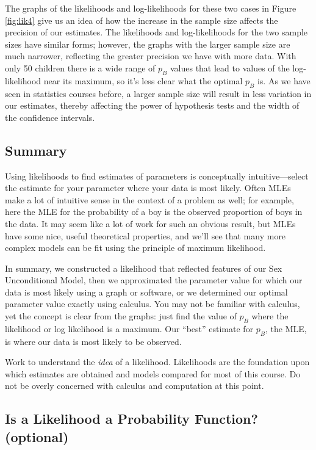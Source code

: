 \documentclass[
]{krantz}
\begin{document}
The graphs of the likelihoods and log-likelihoods for these two cases in Figure \ref{fig:lik4} give us an idea of how the increase in the sample size affects the precision of our estimates. The likelihoods and log-likelihoods for the two sample sizes have similar forms; however, the graphs with the larger sample size are much narrower, reflecting the greater precision we have with more data. With only 50 children there is a wide range of \(p_B\) values that lead to values of the log-likelihood near its maximum, so it's less clear what the optimal \(p_B\) is. As we have seen in statistics courses before, a larger sample size will result in less variation in our estimates, thereby affecting the power of hypothesis tests and the width of the confidence intervals.

\hypertarget{summary}{%
\subsection{Summary}\label{summary}}

Using likelihoods to find estimates of parameters is conceptually intuitive---select the estimate for your parameter where your data is most likely. Often MLEs make a lot of intuitive sense in the context of a problem as well; for example, here the MLE for the probability of a boy is the observed proportion of boys in the data. It may seem like a lot of work for such an obvious result, but MLEs have some nice, useful theoretical properties, and we'll see that many more complex models can be fit using the principle of maximum likelihood.

In summary, we constructed a likelihood that reflected features of our Sex Unconditional Model, then we approximated the parameter value for which our data is most likely using a graph or software, or we determined our optimal parameter value exactly using calculus. You may not be familiar with calculus, yet the concept is clear from the graphs: just find the value of \(p_B\) where the likelihood or log likelihood is a maximum. Our ``best'' estimate for \(p_B\), the MLE, is where our data is most likely to be observed.

Work to understand the \emph{idea} of a likelihood. Likelihoods are the foundation upon which estimates are obtained and models compared for most of this course. Do not be overly concerned with calculus and computation at this point.

\hypertarget{is-a-likelihood-a-probability-function-optional}{%
\subsection{Is a Likelihood a Probability Function? (optional)}\label{is-a-likelihood-a-probability-function-optional}}
\end{document}
